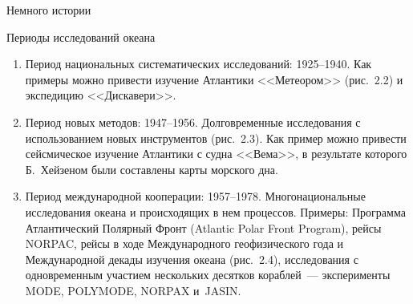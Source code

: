 \begin{chapter}{Немного истории}
\begin{section}{Периоды исследований океана}
\begin{enumerate}

\item
Период национальных систематических исследований: 1925--1940.
Как примеры можно привести изучение Атлантики <<Метеором>> (рис.~2.2) и
экспедицию <<Дискавери>>.
%


\item
Период новых методов: 1947--1956. Долговременные
исследования с использованием новых инструментов (рис.~2.3). Как
пример можно привести сейсмическое изучение Атлантики с судна <<Вема>>, в
результате которого Б.~Хейзеном были составлены карты морского дна.
%


\item
Период международной кооперации: 1957--1978.
Многонациональные исследования океана и происходящих в нем процессов.
Примеры: Программа Атлантический Полярный Фронт
(Atlantic Polar Front Program), рейсы NORPAC, рейсы в ходе
Международного геофизического года и Международной декады изучения
океана (рис.~2.4), исследования с одновременным участием нескольких
десятков кораблей~--- эксперименты MODE, POLYMODE, NORPAX и~JASIN.
%


\end{enumerate}
\end{section}
\end{chapter}
